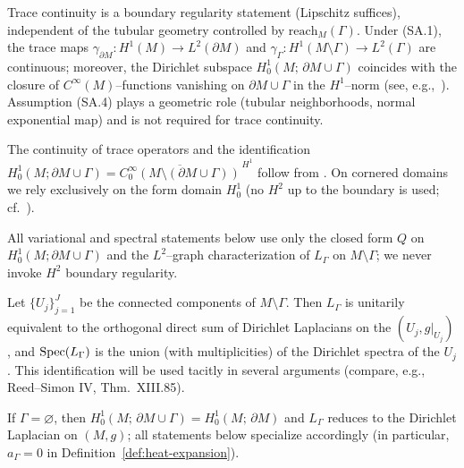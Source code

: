 \begin{remark}\label{rem:trace-continuity}
Trace continuity is a boundary regularity statement (Lipschitz suffices), independent of the tubular geometry controlled by $\mathrm{reach}_M(\Gamma)$.
Under (SA.1), the trace maps $\gamma_{\partial M}:H^1(M)\to L^2(\partial M)$ and
$\gamma_{\Gamma}:H^1(M\setminus\Gamma)\to L^2(\Gamma)$ are continuous; moreover, the Dirichlet subspace
$H^1_0(M;\,\partial M\cup\Gamma)$ coincides with the closure of $C^\infty(M)$–functions vanishing on $\partial M\cup\Gamma$ in the $H^1$–norm (see, e.g.,~\cite[Chs.~1–2]{Grisvard1985}).
Assumption (SA.4) plays a geometric role (tubular neighborhoods, normal exponential map) and is not required for trace continuity.
\end{remark}

\begin{remark}\label{rem:grisvard-nums}
The continuity of trace operators and the identification
$H^1_0(M;\partial M\cup\Gamma)=\overline{C^\infty_0(M\setminus(\partial M\cup\Gamma))}^{\,H^1}$
follow from \cite[Thm.~1.5.1–1.5.2,\;§1.5]{Grisvard1985}.
On cornered domains we rely exclusively on the form domain $H^1_0$ (no $H^2$ up to the boundary is used; cf.\ \cite[Ch.~4]{Grisvard1985}).
\end{remark}

\begin{remark}\label{rem:noH2}
All variational and spectral statements below use only the closed form $Q$ on $H^1_0(M;\partial M\cup\Gamma)$ and the $L^2$–graph characterization of $L_\Gamma$ on $M\setminus\Gamma$; we never invoke $H^2$ boundary regularity.
\end{remark}

\begin{remark}\label{rem:components}
Let $\{U_j\}_{j=1}^J$ be the connected components of $M\setminus\Gamma$.
Then $L_\Gamma$ is unitarily equivalent to the orthogonal direct sum of Dirichlet Laplacians on the $(U_j,g|_{U_j})$, and $\operatorname{Spec}(L_\Gamma)$ is the union (with multiplicities) of the Dirichlet spectra of the $U_j$.
This identification will be used tacitly in several arguments (compare, e.g., Reed–Simon IV, Thm.~XIII.85).
\end{remark}

\begin{remark}[Trivial case $\Gamma=\varnothing$]\label{rem:empty}
If $\Gamma=\varnothing$, then $H^1_0(M;\,\partial M\cup\Gamma)=H^1_0(M;\,\partial M)$ and $L_\Gamma$ reduces to the Dirichlet Laplacian on $(M,g)$; all statements below specialize accordingly (in particular, $a_\Gamma=0$ in Definition~\ref{def:heat-expansion}).
\end{remark}


